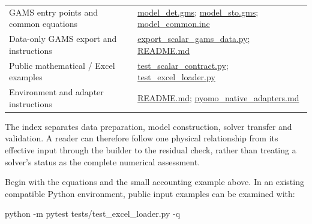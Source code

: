 \documentclass[
  english,
  11pt,
  a4paper,
]{article}
\newenvironment{Shaded}{\begin{snugshade}}{\end{snugshade}}
\newcommand{\AttributeTok}[1]{\textcolor[rgb]{0.40,0.45,0.13}{#1}}
\newcommand{\ExtensionTok}[1]{\textcolor[rgb]{0.00,0.23,0.31}{#1}}
\newcommand{\NormalTok}[1]{\textcolor[rgb]{0.00,0.23,0.31}{#1}}
\begin{document}
\begin{longtable}[]{@{}
  >{\raggedright\arraybackslash}p{}
  >{\raggedright\arraybackslash}p{}@{}}
GAMS entry points and common equations &
\href{https://github.com/unb-lamfo-or-ai-hpc/model-agrologistic/blob/c80dca69c247753d49f06925ec712fcd43bb5a56/manuscript/supplement/appendix_c/model_det.gms}{model\_det.gms};
\href{https://github.com/unb-lamfo-or-ai-hpc/model-agrologistic/blob/c80dca69c247753d49f06925ec712fcd43bb5a56/manuscript/supplement/appendix_c/model_sto.gms}{model\_sto.gms};
\href{https://github.com/unb-lamfo-or-ai-hpc/model-agrologistic/blob/c80dca69c247753d49f06925ec712fcd43bb5a56/manuscript/supplement/appendix_c/model_common.inc}{model\_common.inc} \\
Data-only GAMS export and instructions &
\href{https://github.com/unb-lamfo-or-ai-hpc/model-agrologistic/blob/c80dca69c247753d49f06925ec712fcd43bb5a56/scripts/export_scalar_gams_data.py}{export\_scalar\_gams\_data.py};
\href{https://github.com/unb-lamfo-or-ai-hpc/model-agrologistic/blob/c80dca69c247753d49f06925ec712fcd43bb5a56/manuscript/supplement/appendix_c/README.md}{README.md} \\
Public mathematical / Excel examples &
\href{https://github.com/unb-lamfo-or-ai-hpc/model-agrologistic/blob/c80dca69c247753d49f06925ec712fcd43bb5a56/tests/test_scalar_contract.py}{test\_scalar\_contract.py};
\href{https://github.com/unb-lamfo-or-ai-hpc/model-agrologistic/blob/c80dca69c247753d49f06925ec712fcd43bb5a56/tests/test_excel_loader.py}{test\_excel\_loader.py} \\
Environment and adapter instructions &
\href{https://github.com/unb-lamfo-or-ai-hpc/model-agrologistic/blob/c80dca69c247753d49f06925ec712fcd43bb5a56/README.md}{README.md};
\href{https://github.com/unb-lamfo-or-ai-hpc/model-agrologistic/blob/c80dca69c247753d49f06925ec712fcd43bb5a56/docs/pyomo_native_adapters.md}{pyomo\_native\_adapters.md} \\
\end{longtable}

The index separates data preparation, model construction, solver
transfer and validation. A reader can therefore follow one physical
relationship from its effective input through the builder to the
residual check, rather than treating a solver's status as the complete
numerical assessment.

Begin with the equations and the small accounting example above. In an
existing compatible Python environment, public input examples can be
examined with:

\begin{Shaded}
\begin{Highlighting}[]
\ExtensionTok{python} \AttributeTok{{-}m}\NormalTok{ pytest tests/test\_excel\_loader.py }\AttributeTok{{-}q}
\end{Highlighting}
\end{Shaded}
\end{document}
